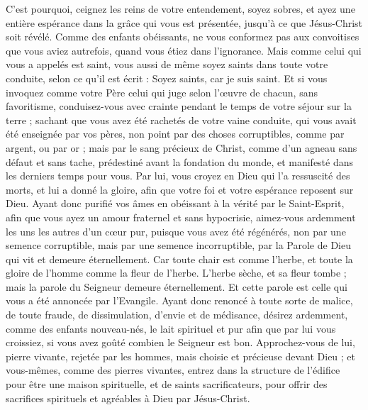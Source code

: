 \begin{multicols}{2}
C’est pourquoi, ceignez les reins de votre entendement, soyez sobres, et ayez une entière espérance dans la grâce qui vous est présentée, jusqu'à ce que Jésus-Christ soit révélé.
Comme des enfants obéissants, ne vous conformez pas aux convoitises que vous aviez autrefois, quand vous étiez dans l’ignorance.
Mais comme celui qui vous a appelés est saint, vous aussi de même soyez saints dans toute votre conduite,
selon ce qu'il est écrit : Soyez saints, car je suis saint.
Et si vous invoquez comme votre Père celui qui juge selon l’œuvre de chacun, sans favoritisme, conduisez-vous avec crainte pendant le temps de votre séjour sur la terre ;
sachant que vous avez été rachetés de votre vaine conduite, qui vous avait été enseignée par vos pères, non point par des choses corruptibles, comme par argent, ou par or ;
mais par le sang précieux de Christ, comme d’un agneau sans défaut et sans tache,
prédestiné avant la fondation du monde, et manifesté dans les derniers temps pour vous.
Par lui, vous croyez en Dieu qui l'a ressuscité des morts, et lui a donné la gloire, afin que votre foi et votre espérance reposent sur Dieu.
Ayant donc purifié vos âmes en obéissant à la vérité par le Saint-Esprit, afin que vous ayez un amour fraternel et sans hypocrisie, aimez-vous ardemment les uns les autres d'un cœur pur,
puisque vous avez été régénérés, non par une semence corruptible, mais par une semence incorruptible, par la Parole de Dieu qui vit et demeure éternellement.
Car toute chair est comme l'herbe, et toute la gloire de l'homme comme la fleur de l'herbe. L'herbe sèche, et sa fleur tombe ;
mais la parole du Seigneur demeure éternellement. Et cette parole est celle qui vous a été annoncée par l’Evangile.
\VerseOne{}Ayant donc renoncé à toute sorte de malice, de toute fraude, de dissimulation, d'envie et de médisance,
désirez ardemment, comme des enfants nouveau-nés, le lait spirituel et pur afin que par lui vous croissiez,
si vous avez goûté combien le Seigneur est bon.
Approchez-vous de lui, pierre vivante, rejetée par les hommes, mais choisie et précieuse devant Dieu ;
et vous-mêmes, comme des pierres vivantes, entrez dans la structure de l’édifice pour être une maison spirituelle, et de saints sacrificateurs, pour offrir des sacrifices spirituels et agréables à Dieu par Jésus-Christ.

\end{multicols}
